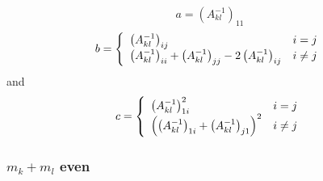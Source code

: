\documentclass[12pt]{article}
\begin{document}
\begin{equation}
a=\left(  A_{kl}^{-1}\right)  _{11}%
\end{equation}%
\begin{equation}
b=\left\{
\begin{array}
[c]{ll}%
\left(  A_{kl}^{-1}\right)  _{ij} & i=j\\
\left(  A_{kl}^{-1}\right)  _{ii}+\left(  A_{kl}^{-1}\right)  _{jj}-2\left(
A_{kl}^{-1}\right)  _{ij} & i\neq j
\end{array}
\right.
\end{equation}
and
\begin{equation}
c=\left\{
\begin{array}
[c]{ll}%
\left(  A_{kl}^{-1}\right)  _{1i}^{2} & i=j\\
\left(  \left(  A_{kl}^{-1}\right)  _{1i}+\left(  A_{kl}^{-1}\right)
_{j1}\right)  ^{2} & i\neq j
\end{array}
\right.
\end{equation}

\subsubsection{$m_{k}+m_{l}$ even}
\end{document}
